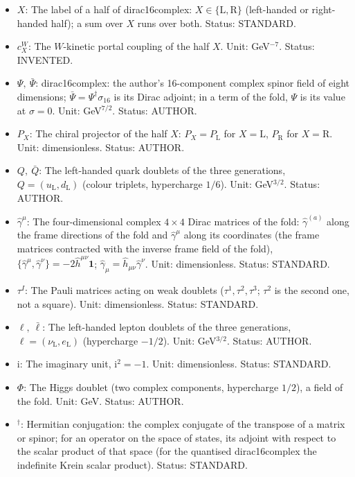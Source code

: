 \documentclass[
  10pt,
]{article}
\begin{document}
\begin{itemize}
  square root of the portal factor. Unit: dimensionless. Value: 1 where
  dirac16complex vanishes. Status: DERIVED.
\item
  \(X\): The label of a half of dirac16complex:
  \(X \in \{\mathrm{L}, \mathrm{R}\}\) (left-handed or right-handed
  half); a sum over \(X\) runs over both. Status: STANDARD.
\item
  \(c^{W}_X\): The \(W\)-kinetic portal coupling of the half \(X\).
  Unit: GeV\(^{-7}\). Status: INVENTED.
\item
  \(\Psi,\ \bar\Psi\): dirac16complex: the author's 16-component complex
  spinor field of eight dimensions;
  \(\bar\Psi = \Psi^\dagger\sigma_{16}\) is its Dirac adjoint; in a term
  of the fold, \(\Psi\) is its value at \(\sigma = 0\). Unit:
  GeV\(^{7/2}\). Status: AUTHOR.
\item
  \(P_X\): The chiral projector of the half \(X\):
  \(P_X = P_{\mathrm{L}}\) for \(X = \mathrm{L}\), \(P_{\mathrm{R}}\)
  for \(X = \mathrm{R}\). Unit: dimensionless. Status: AUTHOR.
\item
  \(Q,\ \bar Q\): The left-handed quark doublets of the three
  generations, \(Q = (u_{\mathrm{L}}, d_{\mathrm{L}})\) (colour
  triplets, hypercharge \(1/6\)). Unit: GeV\(^{3/2}\). Status: AUTHOR.
\item
  \(\hat\gamma^\mu\): The four-dimensional complex \(4 \times 4\) Dirac
  matrices of the fold: \(\hat\gamma^{(a)}\) along the frame directions
  of the fold and \(\hat\gamma^\mu\) along its coordinates (the frame
  matrices contracted with the inverse frame field of the fold),
  \(\{\hat\gamma^\mu, \hat\gamma^\nu\} = -2\hat h^{\mu\nu}\mathbf{1}\);
  \(\hat\gamma_\mu = \hat h_{\mu\nu}\hat\gamma^\nu\). Unit:
  dimensionless. Status: STANDARD.
\item
  \(\tau^I\): The Pauli matrices acting on weak doublets
  (\(\tau^1, \tau^2, \tau^3\); \(\tau^2\) is the second one, not a
  square). Unit: dimensionless. Status: STANDARD.
\item
  \(\ell,\ \bar\ell\): The left-handed lepton doublets of the three
  generations, \(\ell = (\nu_{\mathrm{L}}, e_{\mathrm{L}})\)
  (hypercharge \(-1/2\)). Unit: GeV\(^{3/2}\). Status: AUTHOR.
\item
  \(\mathrm{i}\): The imaginary unit, \(\mathrm{i}^2 = -1\). Unit:
  dimensionless. Status: STANDARD.
\item
  \(\Phi\): The Higgs doublet (two complex components, hypercharge
  \(1/2\)), a field of the fold. Unit: GeV. Status: AUTHOR.
\item
  \({}^\dagger\): Hermitian conjugation: the complex conjugate of the
  transpose of a matrix or spinor; for an operator on the space of
  states, its adjoint with respect to the scalar product of that space
  (for the quantised dirac16complex the indefinite Krein scalar
  product). Status: STANDARD.
\end{itemize}
\end{document}
